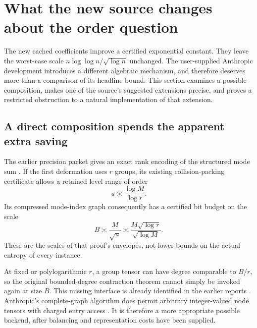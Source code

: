 \section{What the new source changes about the order question}
\label{sec:order-research}

The new cached coefficients improve a certified exponential constant.
They leave the worst-case scale
$n\log\log n/\sqrt{\log n}$ unchanged.  The user-supplied Anthropic
development introduces a different algebraic mechanism, and therefore
deserves more than a comparison of its headline bound.  This section
examines a possible composition, makes one of the source's suggested
extensions precise, and proves a restricted obstruction to a natural
implementation of that extension.

\subsection{A direct composition spends the apparent extra saving}

The earlier precision packet gives an exact rank encoding of the
structured mode sum \cite{precision}.  If the first deformation uses
$r$ groups, its existing collision-packing certificate allows a retained
level range of order
\[
 u\asymp\frac{\log M}{\log r}.
\]
Its compressed mode-index graph consequently has a certified bit budget
on the scale
\begin{equation}
 B\asymp\frac{M}{\sqrt u}
       \asymp\frac{M\sqrt{\log r}}{\sqrt{\log M}}.
 \label{eq:composition-budget}
\end{equation}
These are the scales of that proof's envelopes, not lower bounds on the
actual entropy of every instance.

At fixed or polylogarithmic $r$, a group tensor can have degree comparable
to $B/r$, so the original bounded-degree contraction theorem cannot
simply be invoked again at size $B$.  This missing interface is already
identified in the earlier reports \cite{precision,barriers}.
Anthropic's complete-graph algorithm does permit arbitrary integer-valued node tensors
with charged entry access \cite[Theorem A]{anthropic}.  It is therefore a
more appropriate possible backend, after balancing and representation
costs have been supplied.

